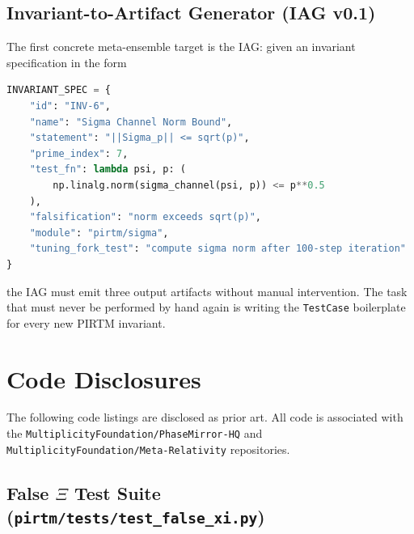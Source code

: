\documentclass[12pt,letterpaper]{article}
\theoremstyle{definition}
\theoremstyle{remark}
\begin{document}
\subsection{Invariant-to-Artifact Generator (IAG v0.1)}

The first concrete meta-ensemble target is the IAG: given an invariant specification in the form

\begin{lstlisting}[language=Python, caption={Invariant Specification Input Contract}]
INVARIANT_SPEC = {
    "id": "INV-6",
    "name": "Sigma Channel Norm Bound",
    "statement": "||Sigma_p|| <= sqrt(p)",
    "prime_index": 7,
    "test_fn": lambda psi, p: (
        np.linalg.norm(sigma_channel(psi, p)) <= p**0.5
    ),
    "falsification": "norm exceeds sqrt(p)",
    "module": "pirtm/sigma",
    "tuning_fork_test": "compute sigma norm after 100-step iteration"
}
\end{lstlisting}

the IAG must emit three output artifacts without manual intervention. The task that must never be performed by hand again is writing the \texttt{TestCase} boilerplate for every new PIRTM invariant.

\section{Code Disclosures}

The following code listings are disclosed as prior art. All code is associated with the \texttt{MultiplicityFoundation/PhaseMirror-HQ} and \texttt{MultiplicityFoundation/Meta-Relativity} repositories.

\subsection{False $\Xi$ Test Suite (\texttt{pirtm/tests/test\_false\_xi.py})}
\end{document}
